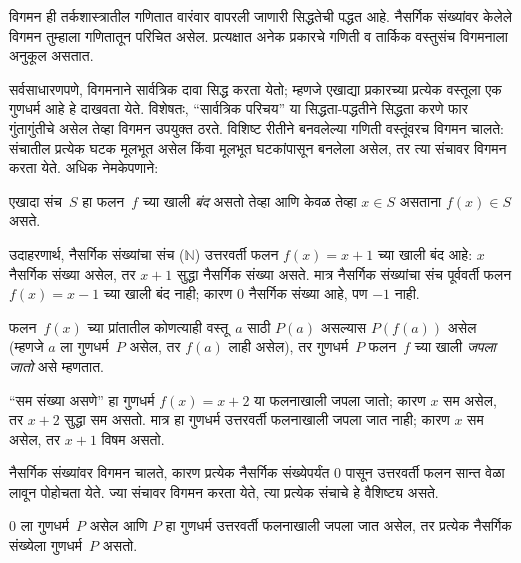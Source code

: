 \begin{explain}
विगमन ही तर्कशास्त्रातील गणितात वारंवार वापरली जाणारी
सिद्धतेची पद्धत आहे. नैसर्गिक संख्यांवर केलेले विगमन
तुम्हाला गणितातून परिचित असेल. प्रत्यक्षात अनेक प्रकारचे
गणिती व तार्किक वस्तुसंच विगमनाला अनुकूल असतात.

सर्वसाधारणपणे, विगमनाने सार्वत्रिक दावा सिद्ध करता येतो;
म्हणजे एखाद्या प्रकारच्या प्रत्येक वस्तूला एक गुणधर्म आहे हे
दाखवता येते. विशेषतः, “सार्वत्रिक परिचय” या सिद्धता-पद्धतीने
सिद्धता करणे फार गुंतागुंतीचे असेल तेव्हा विगमन उपयुक्त ठरते.
विशिष्ट रीतीने बनवलेल्या गणिती वस्तूंवरच विगमन चालते:
संचातील प्रत्येक घटक मूलभूत असेल किंवा मूलभूत घटकांपासून
बनलेला असेल, तर त्या संचावर विगमन करता येते. अधिक नेमकेपणाने:
\end{explain}

\begin{defn}
एखादा संच~$S$ हा फलन~$f$ च्या खाली \emph{बंद} असतो तेव्हा
आणि केवळ तेव्हा $x \in
S$ असताना $f(x) \in S$ असते.
\end{defn}

\begin{explain}
उदाहरणार्थ, नैसर्गिक संख्यांचा संच ($\mathbb{N}$) उत्तरवर्ती
फलन $f(x) = x+1$ च्या खाली बंद आहे: $x$ नैसर्गिक संख्या
असेल, तर $x+1$ सुद्धा नैसर्गिक संख्या असते. मात्र नैसर्गिक
संख्यांचा संच पूर्ववर्ती फलन $f(x) = x-1$ च्या खाली बंद
नाही; कारण $0$ नैसर्गिक संख्या आहे, पण $-1$ नाही.
\end{explain}

\begin{defn}
फलन~$f(x)$ च्या प्रांतातील कोणत्याही वस्तू~$a$ साठी $P(a)$
असल्यास $P(f(a))$ असेल (म्हणजे $a$ ला गुणधर्म~$P$ असेल,
तर $f(a)$ लाही असेल), तर गुणधर्म~$P$ फलन~$f$ च्या खाली
\emph{जपला जातो} असे म्हणतात.
\end{defn}

\begin{explain}
“सम संख्या असणे” हा गुणधर्म $f(x) = x+2$ या फलनाखाली
जपला जातो; कारण $x$ सम असेल, तर $x+2$ सुद्धा सम असतो.
मात्र हा गुणधर्म उत्तरवर्ती फलनाखाली जपला जात नाही;
कारण $x$ सम असेल, तर $x+1$ विषम असतो.

नैसर्गिक संख्यांवर विगमन चालते, कारण प्रत्येक नैसर्गिक
संख्येपर्यंत 0 पासून उत्तरवर्ती फलन सान्त वेळा लावून
पोहोचता येते. ज्या संचावर विगमन करता येते, त्या प्रत्येक
संचाचे हे वैशिष्ट्य असते.
\end{explain}

\begin{defn}
0 ला गुणधर्म~$P$ असेल आणि $P$ हा गुणधर्म उत्तरवर्ती
फलनाखाली जपला जात असेल, तर प्रत्येक नैसर्गिक संख्येला
गुणधर्म~$P$ असतो.
\end{defn}

